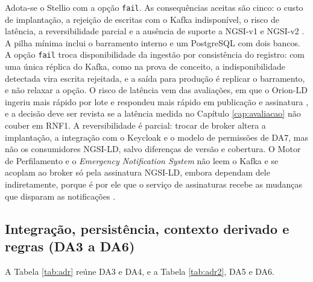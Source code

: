 Adota-se o Stellio \cite{stellio2025docs} com a opção \texttt{fail}. As consequências aceitas são cinco: o custo de implantação, a rejeição de escritas com o Kafka indisponível, o risco de latência, a reversibilidade parcial e a ausência de suporte a NGSI-v1 e NGSI-v2 \cite{fiware2026catalogue}. A pilha mínima inclui o barramento interno e um PostgreSQL com dois bancos. A opção \texttt{fail} troca disponibilidade da ingestão por consistência do registro: com uma única réplica do Kafka, como na prova de conceito, a indisponibilidade detectada vira escrita rejeitada, e a saída para produção é replicar o barramento, e não relaxar a opção. O risco de latência vem das avaliações, em que o Orion-LD ingeriu mais rápido por lote \cite{ntallaris2024benchmarking} e respondeu mais rápido em publicação e assinatura \cite{lazidis2022publish}, e a decisão deve ser revista se a latência medida no Capítulo \ref{cap:avaliacao} não couber em RNF1. A reversibilidade é parcial: trocar de broker altera a implantação, a integração com o Keycloak e o modelo de permissões de DA7, mas não os consumidores NGSI-LD, salvo diferenças de versão e cobertura. O Motor de Perfilamento e o \textit{Emergency Notification System} não leem o Kafka e se acoplam ao broker só pela assinatura NGSI-LD, embora dependam dele indiretamente, porque é por ele que o serviço de assinaturas recebe as mudanças que disparam as notificações \cite{stellio2025docs}.

\subsection{Integração, persistência, contexto derivado e regras (DA3 a DA6)}

A Tabela \ref{tab:adr} reúne DA3 e DA4, e a Tabela \ref{tab:adr2}, DA5 e DA6.

